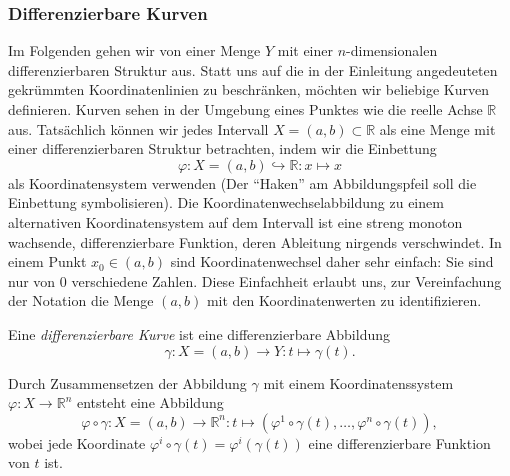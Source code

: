 \subsubsection{Differenzierbare Kurven}
Im Folgenden gehen wir von einer Menge $Y$ mit einer $n$-dimensionalen
differenzierbaren Struktur aus.
Statt uns auf die in der Einleitung angedeuteten gekrümmten
Koordinatenlinien zu beschränken, möchten wir beliebige Kurven
definieren.
Kurven sehen in der Umgebung eines Punktes wie die reelle Achse
$\mathbb{R}$ aus.
Tatsächlich können wir jedes Intervall $X=(a,b)\subset\mathbb{R}$ als
eine Menge mit einer differenzierbaren Struktur betrachten, indem
wir die Einbettung
\[
\varphi
\colon
X=(a,b) \hookrightarrow \mathbb{R}
:
x\mapsto x
\]
als Koordinatensystem verwenden (Der ``Haken'' am Abbildungspfeil
soll die Einbettung symbolisieren).
Die Koordinatenwechselabbildung zu einem alternativen Koordinatensystem
auf dem Intervall ist eine streng monoton wachsende, differenzierbare
Funktion, deren Ableitung nirgends verschwindet.
In einem Punkt $x_0\in (a,b)$ sind Koordinatenwechsel daher sehr
einfach: Sie sind nur von 0 verschiedene Zahlen.
Diese Einfachheit erlaubt uns, zur Vereinfachung der Notation die Menge
$(a,b)$ mit den Koordinatenwerten zu identifizieren.

\begin{definition}
Eine {\em differenzierbare Kurve}
%
%
ist eine differenzierbare Abbildung
\[
\gamma
\colon
X = (a,b) \to Y
:
t \mapsto \gamma(t).
\]
\end{definition}

Durch Zusammensetzen der Abbildung $\gamma$ mit einem Koordinatenssystem
$\varphi\colon X\to \mathbb{R}^n$ entsteht eine Abbildung 
\[
\varphi\circ\gamma
\colon
X=(a,b) \to \mathbb{R}^n
:
t \mapsto (\varphi^1\circ \gamma(t),\dots,\varphi^n\circ\gamma(t)),
\]
wobei jede Koordinate $\varphi^i\circ\gamma(t) = \varphi^i(\gamma(t))$
eine differenzierbare Funktion von $t$ ist.

